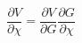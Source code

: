 \begin{equation}
\frac{\partial V} {\partial \chi} = \frac{\partial V} {\partial
G}\frac{\partial G} {\partial \chi}
\end{equation}

